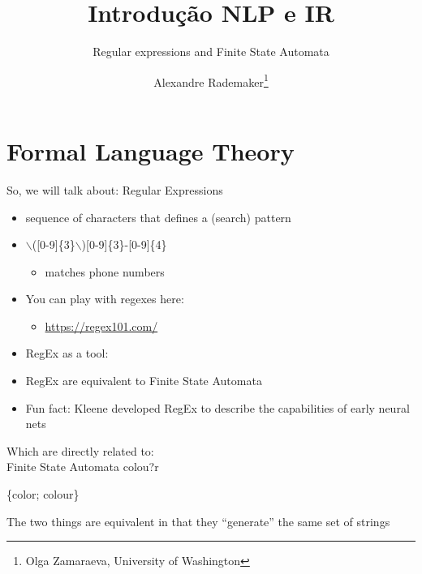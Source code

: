 \documentclass{beamer}
\title{Introdução NLP e IR}
\author[]{Alexandre Rademaker\thanks{Olga Zamaraeva, University of Washington}}
\institute{FGV/EMAp}
\subtitle{Regular expressions and Finite State Automata}
\def\dx{1cm} \def\dy{1.5cm}
\newcommand{\newState}[4]{\node[state,#3](#1)[#4]{#2};}
\newcommand{\newTransition}[4]{\path[->] (#1) edge [#4] node {#3} (#2);}
\begin{document}
   
\begin{frame}
  \maketitle
\end{frame}

\section{Formal Language Theory}

\begin{frame}{So, we will talk about: Regular Expressions}
  \begin{itemize}
  \item sequence of characters that defines a (search) pattern
  \item $\backslash$([0-9]\{3\}$\backslash$)[0-9]\{3\}-[0-9]\{4\}
    \begin{itemize}
    \item matches phone numbers
    \end{itemize}
  \item You can play with regexes here:
    \begin{itemize}
    \item \url{https://regex101.com/}
    \end{itemize}
  \item RegEx as a tool:
  \item RegEx are equivalent to Finite State Automata 
  \item Fun fact: Kleene developed RegEx to describe the capabilities of early neural nets
  \end{itemize}
\end{frame}

\begin{frame}{Which are directly related to: \\ Finite State Automata}
colou?r

\vspace{0.5cm}

\{color; colour\}

\vspace{0.2cm}

\begin{center}
\end{center}
The two things are equivalent in that they ``generate'' the same set of strings
\end{frame}
\end{document}
